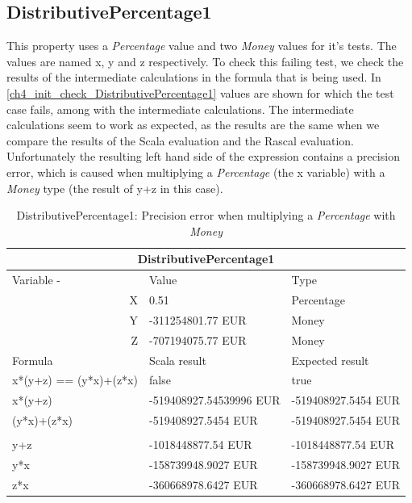 \subsection{DistributivePercentage1}
\label{ssct:ch5_distributivePercentage1}
This property uses a \textit{Percentage} value and two \textit{Money} values for it's tests. The values are named x, y and z respectively. To check this failing test, we check the results of the intermediate calculations in the formula that is being used. In \autoref{ch4_init_check_DistributivePercentage1} values are shown for which the test case fails, among with the intermediate calculations. The intermediate calculations seem to work as expected, as the results are the same when we compare the results of the Scala evaluation and the Rascal evaluation. Unfortunately the resulting left hand side of the expression contains a precision error, which is caused when multiplying a \textit{Percentage} (the x variable) with a \textit{Money} type (the result of y+z in this case).
\FloatBarrier
\begin{table}[h!]
\centering
\begin{tabular}{|lll|}
\hline
\multicolumn{3}{|c|}{DistributivePercentage1}                          \\ \hline
Variable   -            & Value                   & Type                \\
\multicolumn{1}{|r}{X} & 0.51                    & Percentage          \\
\multicolumn{1}{|r}{Y} & -311254801.77 EUR       & Money               \\
\multicolumn{1}{|r}{Z} & -707194075.77 EUR       & Money               \\ \hline
Formula                & Scala result            & Expected result     \\
x*(y+z) == (y*x)+(z*x) & false                   & true                \\
x*(y+z)                & -519408927.54539996 EUR & -519408927.5454 EUR \\
(y*x)+(z*x)            & -519408927.5454 EUR     & -519408927.5454 EUR \\
                       &                         &                     \\
y+z                    & -1018448877.54 EUR      & -1018448877.54 EUR  \\
y*x                    & -158739948.9027 EUR     & -158739948.9027 EUR \\
z*x                    & -360668978.6427 EUR     & -360668978.6427 EUR \\ \hline
\end{tabular}
\caption{DistributivePercentage1: Precision error when multiplying a \textit{Percentage} with \textit{Money}}
\label{ch4_init_check_DistributivePercentage1}
\end{table}
\FloatBarrier

